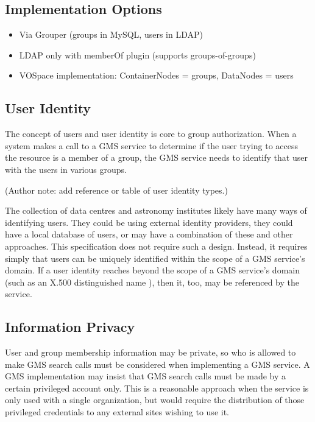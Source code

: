 \documentclass[11pt,a4paper]{ivoa}
\begin{document}
\subsection {Implementation Options}

\begin{itemize}
\item Via Grouper (groups in MySQL, users in LDAP)
\item LDAP only with memberOf plugin (supports groups-of-groups)
\item VOSpace implementation: ContainerNodes = groups, DataNodes = users
\end{itemize}

\subsection{User Identity}

The concept of users and user identity is core to group authorization.  When a system makes a call to a GMS service to determine if the user trying to access the resource is a member of a group, the GMS service needs to identify that user with the users in various groups.

(Author note: add reference or table of user identity types.)

The collection of data centres and astronomy institutes likely have many ways of identifying users.  They could be using external identity providers, they could have a local database of users, or may have a combination of these and other approaches.  This specification does not require such a design.  Instead, it requires simply that users can be uniquely identified within the scope of a GMS service's domain.  If a user identity reaches beyond the scope of a GMS service's domain (such as an X.500 distinguished name \citep{std:RFC1779}), then it, too, may be referenced by the service.

\subsection{Information Privacy}

User and group membership information may be private, so who is allowed to make GMS search calls must be considered when implementing a GMS service.  A GMS implementation may insist that GMS search calls must be made by a certain privileged account only.  This is a reasonable approach when the service is only used with a single organization, but would require the distribution of those privileged credentials to any external sites wishing to use it.
\end{document}
